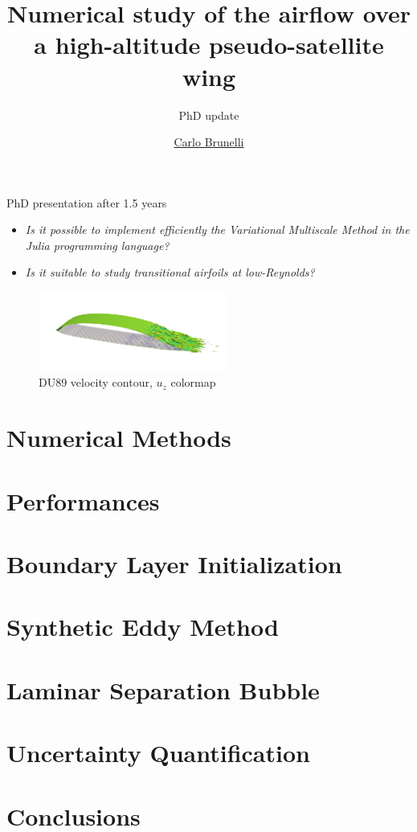 \documentclass{beamer}
\title{Numerical study of the airflow over a high-altitude pseudo-satellite wing}
\subtitle{PhD update}
\author{\href{mailto:mail@carlobrunelli.com}{Carlo Brunelli}}
\begin{document}
\maketitle


\begin{frame}

PhD presentation after 1.5 years
\begin{itemize}
	\item \textit{Is it possible to implement efficiently the Variational Multiscale Method in the Julia programming language?}
	\item \textit{Is it suitable to study transitional airfoils at low-Reynolds?}
\end{itemize}

\begin{figure}[h]
	\centering          
		\includegraphics[width=0.55\textwidth]{ du89_vcontour.png}
		\caption{DU89 velocity contour, $u_z$ colormap}
	\end{figure} 
\end{frame}

\section{Numerical Methods}



\section{Performances}


\section{Boundary Layer Initialization}


\section{Synthetic Eddy Method}



\section{Laminar Separation Bubble}


\section{Uncertainty Quantification}


\section{Conclusions}

\end{document}
